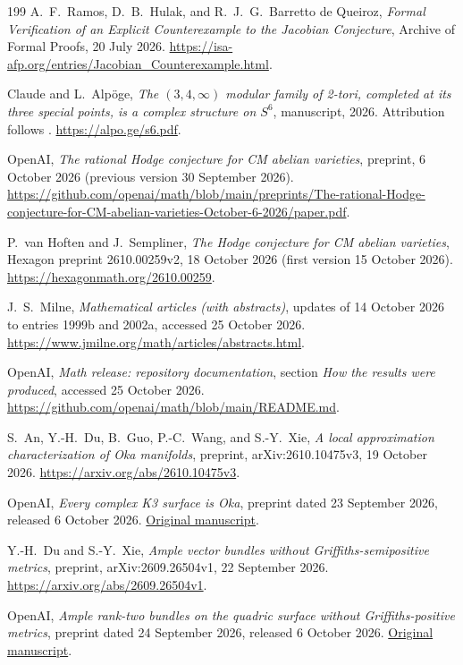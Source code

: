 \documentclass[11pt,reqno]{amsart}
\theoremstyle{definition}
\theoremstyle{remark}
\begin{document}
\begin{thebibliography}{199}
 A.~F.~Ramos, D.~B.~Hulak, and R.~J.~G.~Barretto de Queiroz, \emph{Formal Verification of an Explicit Counterexample to the Jacobian Conjecture}, Archive of Formal Proofs, 20 July 2026. \url{https://isa-afp.org/entries/Jacobian_Counterexample.html}.

 Claude and L.~Alp\"oge, \emph{The $(3,4,\infty)$ modular family of 2-tori, completed at its three special points, is a complex structure on $S^6$}, manuscript, 2026. Attribution follows \cite{SIU-Eng26}. \url{https://alpo.ge/s6.pdf}.

 OpenAI, \emph{The rational Hodge conjecture for CM abelian varieties}, preprint, 6 October 2026 (previous version 30 September 2026). \url{https://github.com/openai/math/blob/main/preprints/The-rational-Hodge-conjecture-for-CM-abelian-varieties-October-6-2026/paper.pdf}.

 P.~van Hoften and J.~Sempliner, \emph{The Hodge conjecture for CM abelian varieties}, Hexagon preprint 2610.00259v2, 18 October 2026 (first version 15 October 2026). \url{https://hexagonmath.org/2610.00259}.

 J.~S.~Milne, \emph{Mathematical articles (with abstracts)}, updates of 14 October 2026 to entries 1999b and 2002a, accessed 25 October 2026. \url{https://www.jmilne.org/math/articles/abstracts.html}.

 OpenAI, \emph{Math release: repository documentation}, section \emph{How the results were produced}, accessed 25 October 2026. \url{https://github.com/openai/math/blob/main/README.md}.

 S.~An, Y.-H.~Du, B.~Guo, P.-C.~Wang, and S.-Y.~Xie, \emph{A local approximation characterization of Oka manifolds}, preprint, arXiv:2610.10475v3, 19 October 2026. \url{https://arxiv.org/abs/2610.10475v3}.

 OpenAI, \emph{Every complex K3 surface is Oka}, preprint dated 23 September 2026, released 6 October 2026. \href{https://github.com/openai/math/blob/main/preprints/Every-complex-K3-surface-is-Oka-September-23-2026/paper.pdf}{Original manuscript}.

 Y.-H.~Du and S.-Y.~Xie, \emph{Ample vector bundles without Griffiths-semipositive metrics}, preprint, arXiv:2609.26504v1, 22 September 2026. \url{https://arxiv.org/abs/2609.26504v1}.

 OpenAI, \emph{Ample rank-two bundles on the quadric surface without Griffiths-positive metrics}, preprint dated 24 September 2026, released 6 October 2026. \href{https://github.com/openai/math/blob/main/preprints/ample-rank-two-bundles-on-the-quadric-surface-without-griffiths-positive-metrics-September-24-2026/paper.pdf}{Original manuscript}.


\end{thebibliography}
\end{document}
